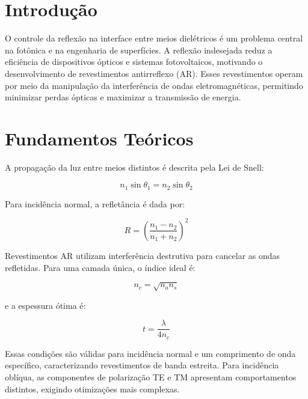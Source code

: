 \documentclass[12pt]{article}
\begin{document}
\vspace{1cm}

\section{Introdução}

O controle da reflexão na interface entre meios dielétricos é um problema central na fotônica e na engenharia de superfícies. A reflexão indesejada reduz a eficiência de dispositivos ópticos e sistemas fotovoltaicos, motivando o desenvolvimento de revestimentos antirreflexo (AR). Esses revestimentos operam por meio da manipulação da interferência de ondas eletromagnéticas, permitindo minimizar perdas ópticas e maximizar a transmissão de energia.

\section{Fundamentos Teóricos}

A propagação da luz entre meios distintos é descrita pela Lei de Snell:

\begin{equation}
    n_1 \sin \theta_1 = n_2 \sin \theta_2
    \label{eq:snell}
\end{equation}

Para incidência normal, a refletância é dada por:

\begin{equation}
    R = \left( \frac{n_1 - n_2}{n_1 + n_2} \right)^2
    \label{eq:fresnel}
\end{equation}

Revestimentos AR utilizam interferência destrutiva para cancelar as ondas refletidas. Para uma camada única, o índice ideal é:

\begin{equation}
    n_c = \sqrt{n_a n_s}
    \label{eq:indice_ideal}
\end{equation}

e a espessura ótima é:

\begin{equation}
    t = \frac{\lambda}{4 n_c}
    \label{eq:espessura}
\end{equation}

Essas condições são válidas para incidência normal e um comprimento de onda específico, caracterizando revestimentos de banda estreita. Para incidência oblíqua, as componentes de polarização TE e TM apresentam comportamentos distintos, exigindo otimizações mais complexas.
\end{document}
